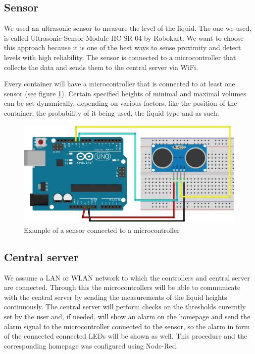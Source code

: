 \documentclass{article}
\begin{document}
\subsection{Sensor}
We used an ultrasonic sensor to measure the level of the liquid. The one we used, is called Ultrasonic Sensor Module HC-SR-04 by Robokart. 
We want to choose this approach because it is one of the best ways to sense proximity and detect levels with high reliability. The sensor is connected to a microcontroller 
that collects the data and sends them to the central server via WiFi.  

Every container will have a microcontroller that is connected to at least one sensor (see figure \ref{sensorWithArduino}).
Certain specified heights of minimal and maximal volumes can be set dynamically, depending on various factors, like the position of the container, the probability of it being used, the liquid type and as such.

\begin{figure}[h]
\includegraphics[scale=0.5]{sensorAndArduino.jpg}
\caption{Example of a sensor connected to a microcontroller}
\label{sensorWithArduino}
\end{figure}

\subsection{Central server}

We assume a LAN or WLAN network to which the controllers and central
server are connected. Through this the microcontrollers will be able to communicate with the central server by sending the measurements of the liquid heights continuously. 
The central server will perform checks on the thresholds curerntly set by the user and, if needed, will show an alarm on the homepage and send the alarm signal to the microcontroller connected to the sensor, so the alarm in form of the connected connected LEDs will be shown as well. This procedure and the corresponding homepage was configured using Node-Red.
\end{document}
